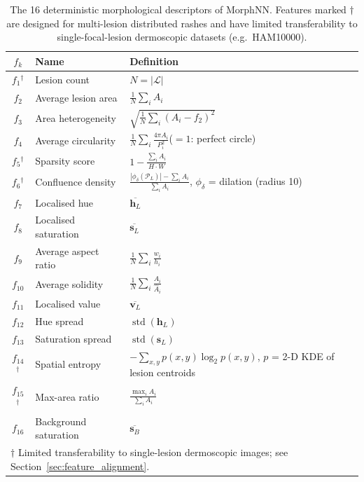 \documentclass[preprint,12pt]{elsarticle}
\begin{document}
\begin{table}[htbp]
\centering
\caption{The 16 deterministic morphological descriptors of MorphNN.
  Features marked $\dagger$ are designed for multi-lesion distributed
  rashes and have limited transferability to single-focal-lesion
  dermoscopic datasets (e.g.\ HAM10000).}
\label{tab:morph_features}
\renewcommand{\arraystretch}{1.15}
\begin{tabular}{clp{6.5cm}}
\toprule
$f_k$ & \textbf{Name} & \textbf{Definition} \\
\midrule
$f_1$$^\dagger$ & Lesion count &
  $N = |\mathcal{L}|$ \\
$f_2$ & Average lesion area &
  $\frac{1}{N}\sum_i A_i$ \\
$f_3$ & Area heterogeneity &
  $\sqrt{\frac{1}{N}\sum_i(A_i - f_2)^2}$ \\
$f_4$ & Average circularity &
  $\frac{1}{N}\sum_i \frac{4\pi A_i}{P_i^2}$\quad($=1$: perfect circle) \\
$f_5$$^\dagger$ & Sparsity score &
  $1 - \frac{\sum_i A_i}{H \cdot W}$ \\
$f_6$$^\dagger$ & Confluence density &
  $\frac{|\phi_\delta(\mathcal{P}_L)| - \sum_i A_i}{\sum_i A_i}$,\;
  $\phi_\delta$ = dilation (radius 10) \\
$f_7$ & Localised hue &
  $\overline{\mathbf{h}_L}$ \\
$f_8$ & Localised saturation &
  $\overline{\mathbf{s}_L}$ \\
$f_9$ & Average aspect ratio &
  $\frac{1}{N}\sum_i \frac{w_i}{h_i}$ \\
$f_{10}$ & Average solidity &
  $\frac{1}{N}\sum_i \frac{A_i}{\hat{A}_i}$ \\
$f_{11}$ & Localised value &
  $\overline{\mathbf{v}_L}$ \\
$f_{12}$ & Hue spread &
  $\operatorname{std}(\mathbf{h}_L)$ \\
$f_{13}$ & Saturation spread &
  $\operatorname{std}(\mathbf{s}_L)$ \\
$f_{14}$$^\dagger$ & Spatial entropy &
  $-\sum_{x,y} p(x,y)\log_2 p(x,y)$,\; $p$ = 2-D KDE of lesion
  centroids \\
$f_{15}$$^\dagger$ & Max-area ratio &
  $\frac{\max_i A_i}{\sum_i A_i}$ \\
$f_{16}$ & Background saturation &
  $\overline{\mathbf{s}_B}$ \\
\bottomrule
\multicolumn{3}{l}{\footnotesize $\dagger$ Limited transferability to
single-lesion dermoscopic images; see Section~\ref{sec:feature_alignment}.}
\end{tabular}
\end{table}
\end{document}
